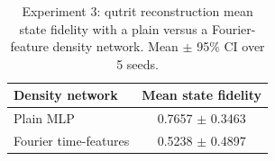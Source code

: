 \begin{table}[ht]
\centering
\caption{Experiment 3: qutrit reconstruction mean state fidelity with a plain versus a Fourier-feature density network. Mean $\pm$ 95\% CI over 5 seeds.}
\label{tab:exp3}
\begin{tabular}{lc}
\toprule
Density network & Mean state fidelity \\
\midrule
Plain MLP & 0.7657 $\pm$ 0.3463 \\
Fourier time-features & 0.5238 $\pm$ 0.4897 \\
\bottomrule
\end{tabular}
\end{table}
